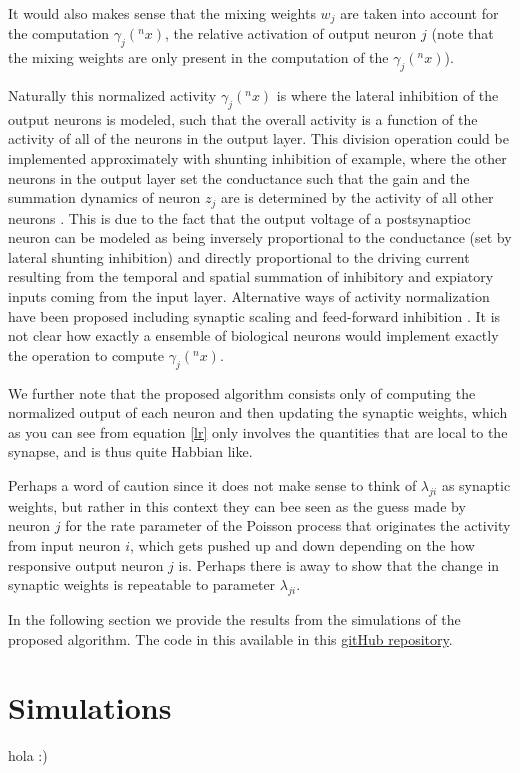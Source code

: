 \documentclass{article}
\begin{document}
It would also makes sense
that the mixing weights \(w_j\) are taken into account for the
computation \(\gamma_j(^nx)\), the relative activation of output neuron
\(j\) (note that the mixing weights are only present in the computation
of the \(\gamma_j(^nx)\)).

Naturally this normalized activity \(\gamma_j(^nx)\) is where the
lateral inhibition of the output neurons is modeled, such that the overall
activity is a function of the activity of all of the neurons in the
output layer. This division operation could be implemented approximately
with shunting inhibition of example, where the other neurons in the
output layer set the conductance such that the gain and the summation
dynamics of neuron \(z_j\) are is determined by the activity of all
other neurons \cite{carandini1994}. This is due to the fact
that the output voltage of a postsynaptioc neuron can be modeled as
being inversely proportional to the conductance (set by lateral shunting
inhibition) and directly proportional to the driving current resulting
from the temporal and spatial summation of inhibitory and expiatory
inputs coming from the input layer. Alternative ways of activity
normalization have been proposed including synaptic scaling and
feed-forward inhibition \cite{carandini2012} \cite{pouille2009}. It is not
clear how exactly a ensemble of biological neurons would implement exactly the
operation to compute \(\gamma_j(^nx)\).

We further note that the proposed algorithm consists only of computing
the normalized output of each neuron and then updating the synaptic
weights, which as you can see from equation \eqref{lr}
only involves the quantities that are local to the synapse, and is thus quite
Habbian like. 

Perhaps a word of caution since it does not make
sense to think of \(\lambda_{ji}\) as synaptic weights, but rather in this context they
can bee seen as the guess made by neuron \(j\) for the rate parameter of
the Poisson process that originates the activity from input neuron \(i\),
which gets pushed up and down depending on the how responsive output
neuron \(j\) is. Perhaps there is away to show that the change in synaptic weights is repeatable to parameter \(\lambda_{ji}\).

In the following section we provide the results from the simulations of the proposed algorithm. The code in this available in this \href{https://github.com/Sann5/neural_populations}{\color{draculacyan} gitHub repository}. 

\section{Simulations}
hola :)

\printbibliography
\end{document}
